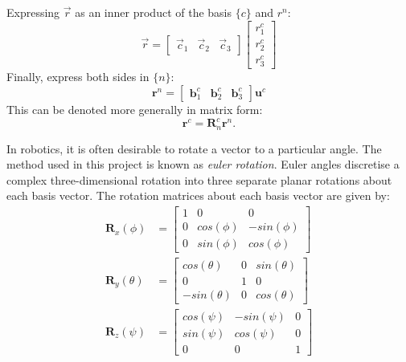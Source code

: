 \documentclass{UoNMCHA}
\numberwithin{equation}{section}
\begin{document}
Expressing $\vec{r}$ as an inner product of the basis $\{c\}$ and $r^{n}$:
\begin{equation}
	\vec{r} = 
	\begin{bmatrix}
		\vec{c}_{1} & \vec{c}_{2} & \vec{c}_{3}
	\end{bmatrix}
	\begin{bmatrix}
		r^{c}_{1}\\
		r^{c}_{2}\\
		r^{c}_{3}
	\end{bmatrix}
\end{equation}
Finally, express both sides in $\{n\}$:
\begin{equation}
	\mathbf{r}^{n} =
	\begin{bmatrix}
        \mathbf{b}^{c}_{1} & \mathbf{b}^{c}_{2} & \mathbf{b}^{c}_{3}
	\end{bmatrix}
	\mathbf{u}^{c}
\end{equation}
This can be denoted more generally in matrix form:
\begin{equation}
	\mathbf{r}^{c} = \mathbf{R}^{c}_{n}\mathbf{r}^{n}.
\end{equation}

In robotics, it is often desirable to rotate a vector to a particular angle. The method used in this project is known as \textit{euler rotation}. Euler angles discretise a complex three-dimensional rotation into three separate planar rotations about each basis vector. The rotation matrices about each basis vector are given by:
\begin{equation}\label{eq:planarRotations}
	\begin{split}
		\mathbf{R}_{x}(\phi) &= 
		\begin{bmatrix}
			1 & 0 & 0\\
			0 & cos(\phi) & -sin(\phi) \\
			0 & sin(\phi) & cos(\phi)
		\end{bmatrix}\\
		\mathbf{R}_{y}(\theta) &= 
		\begin{bmatrix}
			cos(\theta) & 0 & sin(\theta)\\
			0 & 1 & 0 \\
			-sin(\theta) & 0 & cos(\theta)
		\end{bmatrix}\\
		\mathbf{R}_{z}(\psi) &= 
		\begin{bmatrix}
			cos(\psi) & -sin(\psi) & 0\\
			sin(\psi) & cos(\psi) & 0 \\
			0 & 0 & 1
		\end{bmatrix}
	\end{split}
\end{equation}
\end{document}

